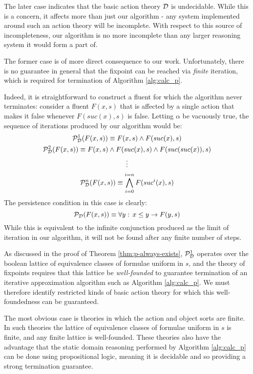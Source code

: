 The later case indicates that the basic action theory $\mathcal{D}$ is undecidable.
While this is a concern, it affects more than just our algorithm -
any system implemented around such an action theory will be incomplete.
With respect to this source of incompleteness, our algorithm is no
more incomplete than any larger reasoning system it would form a part
of.

The former case is of more direct consequence to our work. Unfortunately,
there is no guarantee in general that the fixpoint can be reached
via \emph{finite} iteration, which is required for termination of
Algorithm \ref{alg:calc_p}.

Indeed, it is straightforward to construct a fluent for which the
algorithm never terminates: consider a fluent $F(x,s)$ that is affected
by a single action that makes it false whenever $F(suc(x),s)$ is
false. Letting $\alpha$ be vacuously true, the sequence of iterations
produced by our algorithm would be:\begin{gather*}
\mathcal{P}_{\mathcal{D}}^{1}(F(x,s))\equiv F(x,s)\wedge F(suc(x),s)\\
\mathcal{P}_{\mathcal{D}}^{2}(F(x,s))\equiv F(x,s)\wedge F(suc(x),s)\wedge F(suc(suc(x)),s)\\
\vdots\\
\mathcal{P}_{\mathcal{D}}^{n}(F(x,s))\equiv\bigwedge_{i=0}^{i=n}F(suc^{i}(x),s)\end{gather*}
 The persistence condition in this case is clearly: \[
\mathcal{P}_{\mathcal{D}}(F(x,s))\equiv\forall y:\, x\leq y\rightarrow F(y,s)\]
 While this is equivalent to the infinite conjunction produced as
the limit of iteration in our algorithm, it will not be found after
any finite number of steps.

As discussed in the proof of Theorem \ref{thm:p-always-exists}, $\mathcal{P}_{\mathcal{D}}^{1}$
operates over the boolean lattice of equivalence classes of formulae
uniform in $s$, and the theory of fixpoints requires that this lattice
be \emph{well-founded} to guarantee termination of an iterative approximation
algorithm such as Algorithm \ref{alg:calc_p}. We must therefore identify
restricted kinds of basic action theory for which this well-foundedness
can be guaranteed.

The most obvious case is theories in which the action and object sorts
are finite. In such theories the lattice of equivalence classes of
formulae uniform in $s$ is finite, and any finite lattice is well-founded.
These theories also have the advantage that the static domain reasoning
performed by Algorithm \ref{alg:calc_p} can be done using propositional
logic, meaning it is decidable and so providing a strong termination
guarantee.

